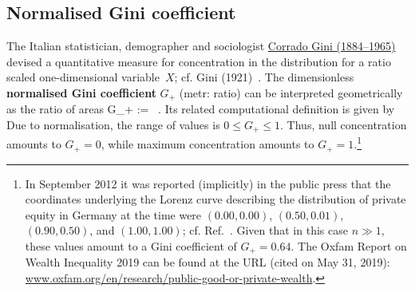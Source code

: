 \subsection[Normalised Gini coefficient]{Normalised Gini 
coefficient}
The Italian statistician, demographer and sociologist
\href{http://en.wikipedia.org/wiki/Corrado_Gini}{Corrado
Gini (1884--1965)} devised a quantitative measure for 
concentration in the distribution for a ratio scaled
one-dimensional variable~$X$; cf. Gini (1921)~. The
dimensionless \textbf{normalised Gini coefficient} $G_{+}$ (metr:
ratio) can be interpreted geometrically as the ratio of areas
%
\be
G_{+} :=  \ .
\ee
%
Its related computational definition is given by
%
\be
{}
\ee
%
Due to normalisation, the range of values is $0 \leq G_{+} \leq 1$.
Thus, null concentration amounts to $G_{+}=0$, while maximum 
concentration amounts to $G_{+}=1$.\footnote{In September 2012 it 
was reported (implicitly) in the public press that the coordinates 
underlying the Lorenz curve describing the distribution of private 
equity in Germany at the time were $(0.00,0.00)$, $(0.50,0.01)$, 
$(0.90,0.50)$, and $(1.00,1.00)$; cf. Ref.~. Given 
that in this case $n \gg 1$, these values amount to a Gini 
coefficient of $G_{+}=0.64$. The Oxfam Report on Wealth Inequality
2019 can be found at the URL (cited on May 31, 2019):
\href{https://www.oxfam.org/en/research/public-good-or-private-wealth}{www.oxfam.org/en/research/public-good-or-private-wealth}.}


